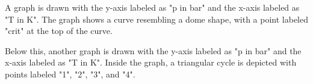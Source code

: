 A graph is drawn with the y-axis labeled as "p in bar" and the x-axis labeled as "T in K". The graph shows a curve resembling a dome shape, with a point labeled "crit" at the top of the curve.  

Below this, another graph is drawn with the y-axis labeled as "p in bar" and the x-axis labeled as "T in K". Inside the graph, a triangular cycle is depicted with points labeled "1", "2", "3", and "4".